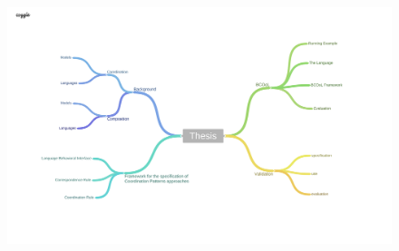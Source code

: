 \begin{itemize}
	
\end{itemize}

\begin{landscape}
\begin{figure}
	\begin{center}
		\includegraphics[width=1\textwidth]{Thesisoutline.pdf}
		\label{fig:thesis outline}
	\end{center}
\end{figure}
\end{landscape}





